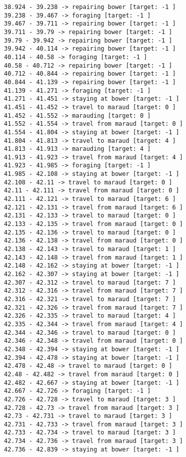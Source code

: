 \documentclass[11pt]{article}
\begin{document}
\begin{Verbatim}[commandchars=\\\{\}]
38.924 - 39.238 -> repairing bower [target: -1 ]
39.238 - 39.467 -> foraging [target: -1 ]
39.467 - 39.711 -> repairing bower [target: -1 ]
39.711 - 39.79 -> repairing bower [target: -1 ]
39.79 - 39.942 -> repairing bower [target: -1 ]
39.942 - 40.114 -> repairing bower [target: -1 ]
40.114 - 40.58 -> foraging [target: -1 ]
40.58 - 40.712 -> repairing bower [target: -1 ]
40.712 - 40.844 -> repairing bower [target: -1 ]
40.844 - 41.139 -> repairing bower [target: -1 ]
41.139 - 41.271 -> foraging [target: -1 ]
41.271 - 41.451 -> staying at bower [target: -1 ]
41.451 - 41.452 -> travel to maraud [target: 0 ]
41.452 - 41.552 -> marauding [target: 0 ]
41.552 - 41.554 -> travel from maraud [target: 0 ]
41.554 - 41.804 -> staying at bower [target: -1 ]
41.804 - 41.813 -> travel to maraud [target: 4 ]
41.813 - 41.913 -> marauding [target: 4 ]
41.913 - 41.923 -> travel from maraud [target: 4 ]
41.923 - 41.985 -> foraging [target: -1 ]
41.985 - 42.108 -> staying at bower [target: -1 ]
42.108 - 42.11 -> travel to maraud [target: 0 ]
42.11 - 42.111 -> travel from maraud [target: 0 ]
42.111 - 42.121 -> travel to maraud [target: 6 ]
42.121 - 42.131 -> travel from maraud [target: 6 ]
42.131 - 42.133 -> travel to maraud [target: 0 ]
42.133 - 42.135 -> travel from maraud [target: 0 ]
42.135 - 42.136 -> travel to maraud [target: 0 ]
42.136 - 42.138 -> travel from maraud [target: 0 ]
42.138 - 42.143 -> travel to maraud [target: 1 ]
42.143 - 42.148 -> travel from maraud [target: 1 ]
42.148 - 42.162 -> staying at bower [target: -1 ]
42.162 - 42.307 -> staying at bower [target: -1 ]
42.307 - 42.312 -> travel to maraud [target: 7 ]
42.312 - 42.316 -> travel from maraud [target: 7 ]
42.316 - 42.321 -> travel to maraud [target: 7 ]
42.321 - 42.326 -> travel from maraud [target: 7 ]
42.326 - 42.335 -> travel to maraud [target: 4 ]
42.335 - 42.344 -> travel from maraud [target: 4 ]
42.344 - 42.346 -> travel to maraud [target: 0 ]
42.346 - 42.348 -> travel from maraud [target: 0 ]
42.348 - 42.394 -> staying at bower [target: -1 ]
42.394 - 42.478 -> staying at bower [target: -1 ]
42.478 - 42.48 -> travel to maraud [target: 0 ]
42.48 - 42.482 -> travel from maraud [target: 0 ]
42.482 - 42.667 -> staying at bower [target: -1 ]
42.667 - 42.726 -> foraging [target: -1 ]
42.726 - 42.728 -> travel to maraud [target: 3 ]
42.728 - 42.73 -> travel from maraud [target: 3 ]
42.73 - 42.731 -> travel to maraud [target: 3 ]
42.731 - 42.733 -> travel from maraud [target: 3 ]
42.733 - 42.734 -> travel to maraud [target: 3 ]
42.734 - 42.736 -> travel from maraud [target: 3 ]
42.736 - 42.839 -> staying at bower [target: -1 ]

\end{Verbatim}
\end{document}
